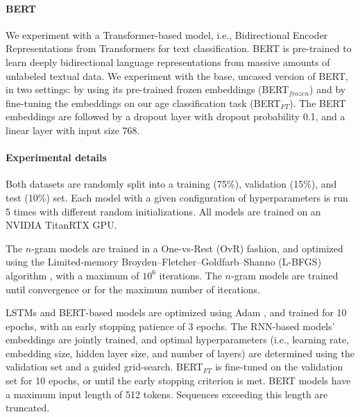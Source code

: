 \paragraph{BERT} 
We experiment with a Transformer-based model, i.e., 
Bidirectional Encoder Representations from Transformers \cite[BERT;][]{devlin-etal-2019-bert} for text classification.
BERT is pre-trained to learn deeply bidirectional language representations from massive amounts of unlabeled textual data. 
We experiment with the base, uncased version of BERT, in two settings: by using its 
pre-trained frozen embeddings (BERT$_{frozen}$) and by fine-tuning the embeddings on our age classification task (BERT$_{FT}$).
The BERT embeddings are followed by a dropout layer with dropout probability 0.1, and a linear layer with input size 768.

\paragraph{Experimental details} %

Both datasets are randomly split into a training (75\%), validation (15\%), and test (10\%) set.
Each model with a given configuration of hyperparameters is run 5 times with different random initializations. All models are trained on an NVIDIA TitanRTX GPU.

The $n$-gram models are trained in a One-vs-Rest (OvR) fashion, and optimized using the Limited-memory Broyden–Fletcher–Goldfarb–Shanno (L-BFGS) algorithm \cite{liu1989limited}, with a maximum of $10^6$ iterations. The $n$-gram models are trained until convergence or for the maximum number of iterations.

LSTMs and BERT-based models
are optimized using Adam \cite{DBLP:journals/corr/KingmaB14}, and trained for 10 epochs, with an early stopping patience of 3 epochs.
The RNN-based models' embeddings are jointly trained, and optimal hyperparameters (i.e., learning rate, embedding size, hidden layer size, and number of layers)  are determined using the validation set and a guided grid-search. %
BERT$_{FT}$ is fine-tuned on the validation set for 10 epochs, or until the early stopping criterion is met.
BERT models have a maximum input length of 512 tokens. Sequences exceeding this length are truncated.